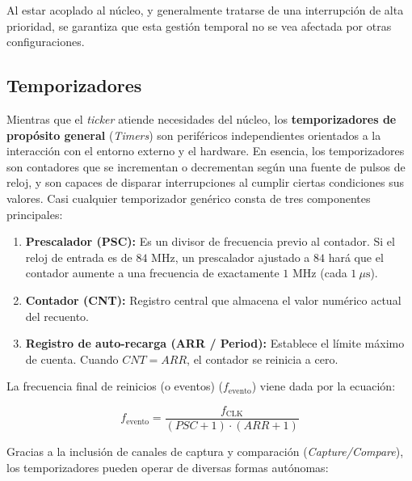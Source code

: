\documentclass[../main.tex]{subfiles}
\begin{document}
        Al estar acoplado al núcleo, y generalmente tratarse de una interrupción de alta prioridad, se garantiza que esta gestión temporal no se vea afectada por otras configuraciones.

    \subsection{Temporizadores}

        Mientras que el \emph{ticker} atiende necesidades del núcleo, los \textbf{temporizadores de propósito general} (\emph{Timers}) son periféricos independientes orientados a la interacción con el entorno externo y el hardware. En esencia, los temporizadores son contadores que se incrementan o decrementan según una fuente de pulsos de reloj, y son capaces de disparar interrupciones al cumplir ciertas condiciones sus valores. Casi cualquier temporizador genérico consta de tres componentes principales:

        \begin{enumerate}
            \item \textbf{Prescalador (PSC):} Es un divisor de frecuencia previo al contador. Si el reloj de entrada es de $84\text{ MHz}$, un prescalador ajustado a $84$ hará que el contador aumente a una frecuencia de exactamente $1\text{ MHz}$ (cada $1\ \mu\text{s}$).
            \item \textbf{Contador (CNT):} Registro central que almacena el valor numérico actual del recuento.
            \item \textbf{Registro de auto-recarga (ARR / Period):} Establece el límite máximo de cuenta. Cuando $CNT = ARR$, el contador se reinicia a cero.
        \end{enumerate}

        La frecuencia final de reinicios (o eventos) ($f_{\text{evento}}$) viene dada por la ecuación:

        $$f_{\text{evento}} = \frac{f_{\text{CLK}}}{(PSC + 1) \cdot (ARR + 1)}$$

        Gracias a la inclusión de canales de captura y comparación (\emph{Capture/Compare}), los temporizadores pueden operar de diversas formas autónomas:
\end{document}

